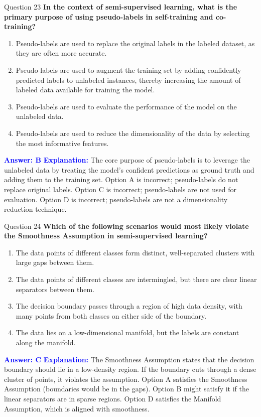 \documentclass{beamer}
\begin{document}
	\begin{frame}{Question 23}
		\textbf{In the context of semi-supervised learning, what is the primary purpose of using pseudo-labels in self-training and co-training?}
		\begin{enumerate}
			\item Pseudo-labels are used to replace the original labels in the labeled dataset, as they are often more accurate.
			\item Pseudo-labels are used to augment the training set by adding confidently predicted labels to unlabeled instances, thereby increasing the amount of labeled data available for training the model.
			\item Pseudo-labels are used to evaluate the performance of the model on the unlabeled data.
			\item Pseudo-labels are used to reduce the dimensionality of the data by selecting the most informative features.
		\end{enumerate}
		\vspace{0.2cm}
		\textcolor{blue}{\textbf{Answer: B}}
		\vspace{0.2cm}
		\textcolor{blue}{\textbf{Explanation:}} The core purpose of pseudo-labels is to leverage the unlabeled data by treating the model's confident predictions as ground truth and adding them to the training set. Option A is incorrect; pseudo-labels do not replace original labels. Option C is incorrect; pseudo-labels are not used for evaluation. Option D is incorrect; pseudo-labels are not a dimensionality reduction technique.
	\end{frame}
	
	\begin{frame}{Question 24}
		\textbf{Which of the following scenarios would most likely violate the Smoothness Assumption in semi-supervised learning?}
		\begin{enumerate}
			\item The data points of different classes form distinct, well-separated clusters with large gaps between them.
			\item The data points of different classes are intermingled, but there are clear linear separators between them.
			\item The decision boundary passes through a region of high data density, with many points from both classes on either side of the boundary.
			\item The data lies on a low-dimensional manifold, but the labels are constant along the manifold.
		\end{enumerate}
		\vspace{0.2cm}
		\textcolor{blue}{\textbf{Answer: C}}
		\vspace{0.2cm}
		\textcolor{blue}{\textbf{Explanation:}} The Smoothness Assumption states that the decision boundary should lie in a low-density region. If the boundary cuts through a dense cluster of points, it violates the assumption. Option A satisfies the Smoothness Assumption (boundaries would be in the gaps). Option B might satisfy it if the linear separators are in sparse regions. Option D satisfies the Manifold Assumption, which is aligned with smoothness.
	\end{frame}
	
\end{document}
